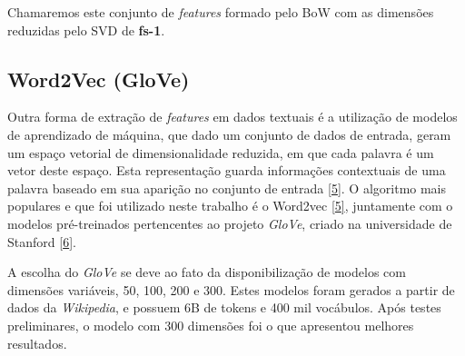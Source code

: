 \documentclass[11pt]{article}
\begin{document}
    Chamaremos este conjunto de \emph{features} formado pelo BoW com as
dimensões reduzidas pelo SVD de \textbf{fs-1}.

    \subsection{Word2Vec (GloVe)}\label{word2vec-glove}

Outra forma de extração de \emph{features} em dados textuais é a
utilização de modelos de aprendizado de máquina, que dado um conjunto de
dados de entrada, geram um espaço vetorial de dimensionalidade reduzida,
em que cada palavra é um vetor deste espaço. Esta representação guarda
informações contextuais de uma palavra baseado em sua aparição no
conjunto de entrada \href{https://arxiv.org/abs/1402.3722}{{[}5{]}}. O
algoritmo mais populares e que foi utilizado neste trabalho é o Word2vec
\href{https://arxiv.org/abs/1402.3722}{{[}5{]}}, juntamente com o
modelos pré-treinados pertencentes ao projeto \emph{GloVe}, criado na
universidade de Stanford
\href{https://nlp.stanford.edu/projects/glove/}{{[}6{]}}.

A escolha do \emph{GloVe} se deve ao fato da disponibilização de modelos
com dimensões variáveis, 50, 100, 200 e 300. Estes modelos foram gerados
a partir de dados da \emph{Wikipedia}, e possuem 6B de tokens e 400 mil
vocábulos. Após testes preliminares, o modelo com 300 dimensões foi o
que apresentou melhores resultados.
\end{document}
